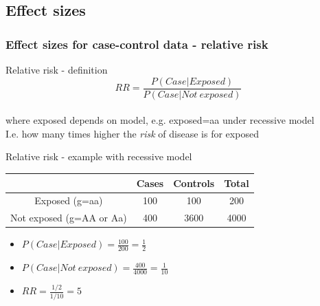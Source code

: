 \documentclass[xcolor=pdftex,dvipsnames,table,10pt]{beamer}
\begin{document}
\subsection{Effect sizes}
\begin{frame}
  \frametitle{Effect sizes for case-control data - relative risk}
  \small
\begin{block}{Relative risk - definition}
 \[RR =\frac{P(Case|Exposed)}{P(Case|Not\ exposed)} \]\\
 where exposed depends on model, e.g. exposed=aa under recessive model \\
\vspace{0.2cm}I.e. how many times higher the \textit{risk} of disease is for exposed\\\vspace{0.1cm}
\end{block}
\begin{block}{Relative risk - example with recessive model}
\vspace{0.1cm}
  {   
\scriptsize{
  \begin{table}
\hspace{-2.4cm}    \begin{tabular}{|c|cc|c|}
\hline
      & Cases & Controls & Total \\
\hline
Exposed (g=aa) & 100 & 100 & 200\\
Not exposed (g=AA or Aa) & 400 & 3600 & 4000\\
 \hline   \end{tabular}
      \end{table}
}
}
\vspace{-0.3cm}
\begin{itemize}
\item $P(Case|Exposed) = \frac{100}{200}=  \frac{1}{2}$
\item $P(Case|Not\ exposed) = \frac{400}{4000}= \frac{1}{10}$
\item $RR = \frac{1/2}{1/10} = 5$ 
\end{itemize}
\end{block}
\end{frame}
\end{document}
